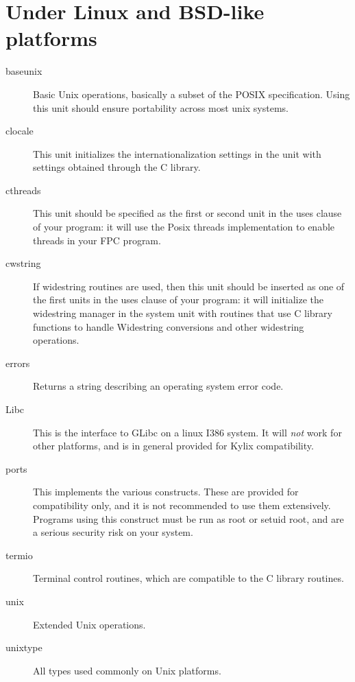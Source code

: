 \section{Under Linux and BSD-like platforms}
\begin{description}
\item[baseunix] Basic Unix operations, basically a subset of the POSIX specification.
Using this unit should ensure portability across most unix systems.
\item[clocale] This unit initializes the internationalization settings in
the  unit with settings obtained through the C library.
\item[cthreads] This unit should be specified as the first or second
unit in the uses clause of your program: it will use the Posix threads
implementation to enable threads in your FPC program.
\item[cwstring] If widestring routines are used, then this unit should
be inserted as one of the first units in the uses clause of your program:
it will initialize the widestring manager in the system unit with routines
that use C library functions to handle Widestring conversions and other
widestring operations.
\item[errors] Returns a string describing an operating system error code.
\item[Libc] This is the interface to GLibc on a linux I386 system. It will
{\em not} work for other platforms, and is in general provided for Kylix
compatibility.
\item[ports] This implements the various  constructs. These are
provided for compatibility only, and it is not recommended to use them
extensively. Programs using this construct must be run as root or setuid
root, and are a serious security risk on your system.
\item[termio] Terminal control routines, which are compatible to the C
library routines.
\item[unix] Extended Unix operations.
\item[unixtype] All types used commonly on Unix platforms.
\end{description}

